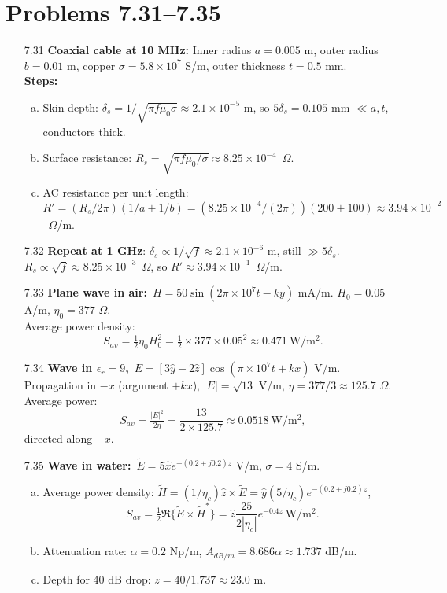 \section*{Problems 7.31--7.35}
\begin{enumerate}

\item[7.31] \textbf{Coaxial cable at 10 MHz:} Inner radius $a=0.005$ m, outer radius $b=0.01$ m, copper $\sigma=5.8\times10^7$ S/m, outer thickness $t=0.5$ mm.
\\
\textbf{Steps:}
\begin{enumerate}[(a)]
  \item Skin depth: $\delta_s=1/\sqrt{\pi f\mu_0\sigma}\approx2.1\times10^{-5}$ m, so $5\delta_s=0.105$ mm $\ll a,t$, conductors thick.
  \item Surface resistance: $R_s=\sqrt{\pi f\mu_0/\sigma}\approx8.25\times10^{-4}$~$\Omega$.
  \item AC resistance per unit length: $R'=(R_s/2\pi)(1/a+1/b)=(8.25\times10^{-4}/(2\pi))(200+100)\approx3.94\times10^{-2}$~$\Omega$/m.
\end{enumerate}

\item[7.32] \textbf{Repeat at 1 GHz}: $\delta_s\propto1/\sqrt{f}\approx2.1\times10^{-6}$ m, still $\gg5\delta_s$.
\\
$R_s\propto\sqrt{f}\approx8.25\times10^{-3}$~$\Omega$, so $R'\approx3.94\times10^{-1}$~$\Omega$/m.

\item[7.33] \textbf{Plane wave in air:}\ $H=50\sin(2\pi\times10^7t-ky)$ mA/m.  $H_0=0.05$ A/m, $\eta_0=377$ $\Omega$.
\\
Average power density:
\[S_{av}=\tfrac12\eta_0H_0^2=\tfrac12\times377\times0.05^2\approx0.471~\mathrm{W/m^2}.\]

\item[7.34] \textbf{Wave in $\epsilon_r=9$,}\ $E=[3\hat y-2\hat z]\cos(\pi\times10^7t+kx)$ V/m.
\\
Propagation in $-x$ (argument $+kx$), $|E|=\sqrt{13}$ V/m, $\eta=377/3\approx125.7$ $\Omega$.  
Average power:
\[S_{av}=\tfrac{|E|^2}{2\eta}=\frac{13}{2\times125.7}\approx0.0518~\mathrm{W/m^2},\]
directed along $-x$.

\item[7.35] \textbf{Wave in water:}\ $\tilde E=5\hat x e^{-(0.2+j0.2)z}$ V/m, $\sigma=4$ S/m.
\\
\begin{enumerate}[(a)]
  \item Average power density:
  $\tilde H=(1/\eta_c)\hat z\times\tilde E=\hat y(5/\eta_c)e^{-(0.2+j0.2)z}$,
  \[S_{av}=\tfrac12\Re\{\tilde E\times\tilde H^*\}=\hat z\frac{25}{2|\eta_c|}e^{-0.4z}~\mathrm{W/m^2}.\]
  \item Attenuation rate: $\alpha=0.2$ Np/m, $A_{dB/m}=8.686\alpha\approx1.737$ dB/m.
  \item Depth for 40 dB drop: $z=40/1.737\approx23.0$ m.
\end{enumerate}

\end{enumerate}

